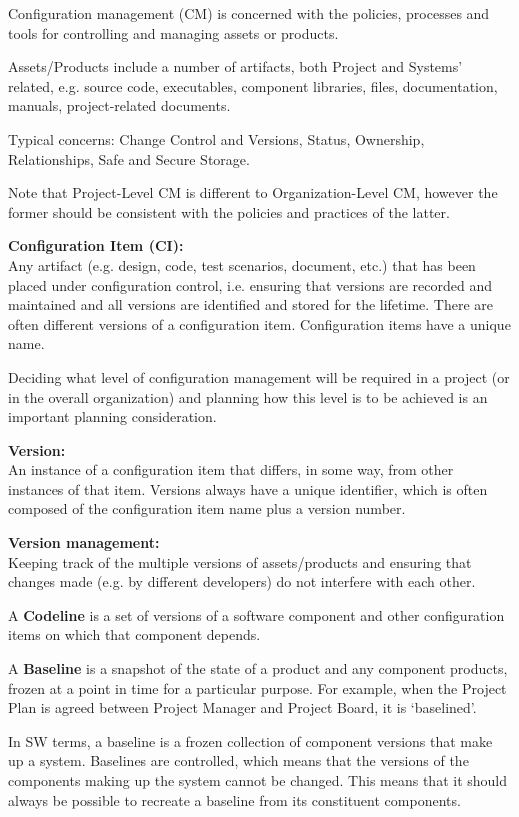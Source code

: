 \documentclass[]{project_plan}
\begin{document}
Configuration management (CM) is concerned with the policies, processes and
tools for controlling and managing assets or products.

Assets/Products include a number of artifacts, both Project and Systems’
related, e.g. source code, executables, component libraries, files,
documentation, manuals, project-related documents.

Typical concerns: Change Control and Versions, Status, Ownership,
Relationships, Safe and Secure Storage.

Note that Project-Level CM is different to Organization-Level CM, however the
former should be consistent with the policies and practices of the latter.

\textbf{Configuration Item (CI):}\\Any artifact (e.g. design, code, test scenarios, document, etc.) that has been
placed under configuration control, i.e. ensuring that versions are recorded and maintained and all
versions are identified and stored for the lifetime. There are often different versions of a configuration
item. Configuration items have a unique name.

Deciding what level of configuration management will be required in a project (or in the overall
organization) and planning how this level is to be achieved is an important planning consideration.

\textbf{Version:}\\An instance of a configuration item that differs, in some way, from other instances of that item.
Versions always have a unique identifier, which is often composed of the configuration item name plus a
version number.

\textbf{Version management:}\\Keeping track of the multiple versions of assets/products and ensuring that changes
made (e.g. by different developers) do not interfere with each other.

A \textbf{Codeline} is a set of versions of a software component and other configuration items on which that
component depends.

A \textbf{Baseline} is a snapshot of the state of a product and any component products, frozen at a point in time for
a particular purpose. For example, when the Project Plan is agreed between Project Manager and Project
Board, it is ‘baselined’.

In SW terms, a baseline is a frozen collection of component versions that make up a system. Baselines are
controlled, which means that the versions of the components making up the system cannot be changed.
This means that it should always be possible to recreate a baseline from its constituent components.
\end{document}
